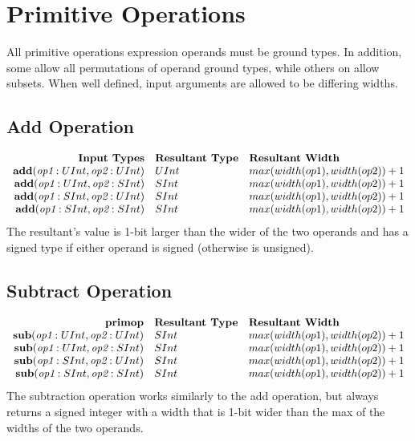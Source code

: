 \documentclass[12pt]{article}
\begin{document}
\section{Primitive Operations} \label{primitives}

All primitive operations expression operands must be ground types.
In addition, some allow all permutations of operand ground types, while others on allow subsets.
When well defined, input arguments are allowed to be differing widths.

\subsection{Add Operation}
\[
\begin{array}{rll}
\text{\bf Input Types} & \text{\bf Resultant Type} & \text{\bf Resultant Width} \\
\text{\bf add}(\text{\em op1}:UInt, \text{\em op2}:UInt) & UInt & max(width(op1),width(op2)) + 1 \\
\text{\bf add}(\text{\em op1}:UInt, \text{\em op2}:SInt) & SInt & max(width(op1),width(op2)) + 1 \\
\text{\bf add}(\text{\em op1}:SInt, \text{\em op2}:UInt) & SInt & max(width(op1),width(op2)) + 1 \\
\text{\bf add}(\text{\em op1}:SInt, \text{\em op2}:SInt) & SInt & max(width(op1),width(op2)) + 1 \\
\end{array}
\]
The resultant's value is 1-bit larger than the wider of the two operands and has a signed type if either operand is signed (otherwise is unsigned).

\subsection{Subtract Operation}
\[
\begin{array}{rll}
\text{\bf primop} & \text{\bf Resultant Type} & \text{\bf Resultant Width} \\
\text{\bf sub}(\text{\em op1}:UInt, \text{\em op2}:UInt) &  SInt & max(width(op1),width(op2)) + 1  \\
\text{\bf sub}(\text{\em op1}:UInt, \text{\em op2}:SInt) &  SInt & max(width(op1),width(op2)) + 1  \\
\text{\bf sub}(\text{\em op1}:SInt, \text{\em op2}:UInt) &  SInt & max(width(op1),width(op2)) + 1  \\
\text{\bf sub}(\text{\em op1}:SInt, \text{\em op2}:SInt) &  SInt & max(width(op1),width(op2)) + 1  \\
\end{array}
\]
The subtraction operation works similarly to the add operation, but always returns a signed integer with a width that is 1-bit wider than the max of the widths of the two operands.
\end{document}
